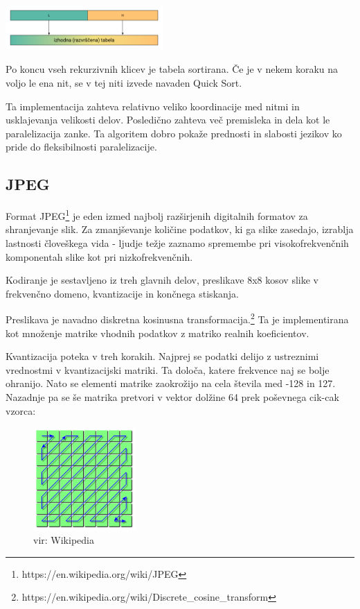\documentclass[journal,a4paper,twoside]{sty/IEEEtran}
\begin{document}
\includegraphics[width=0.45\textwidth]{aqs_diag_4}

Po koncu vseh rekurzivnih klicev je tabela sortirana.
Če je v nekem koraku na voljo le ena nit, se v tej niti izvede navaden Quick Sort.

Ta implementacija zahteva relativno veliko koordinacije med nitmi in usklajevanja velikosti delov.
Posledično zahteva več premisleka in dela kot le paralelizacija zanke.
Ta algoritem dobro pokaže prednosti in slabosti jezikov ko pride do fleksibilnosti paralelizacije.

\subsection{JPEG}

Format JPEG\footnote{https://en.wikipedia.org/wiki/JPEG} je eden izmed najbolj razširjenih digitalnih formatov za shranjevanje slik.
Za zmanjševanje količine podatkov, ki ga slike zasedajo, izrablja lastnosti človeškega vida - ljudje težje zaznamo spremembe pri visokofrekvenčnih
	komponentah slike kot pri nizkofrekvenčnih.

Kodiranje je sestavljeno iz treh glavnih delov, preslikave 8x8 kosov slike v frekvenčno domeno, kvantizacije in končnega stiskanja.

Preslikava je navadno diskretna kosinusna transformacija.\footnote{https://en.wikipedia.org/wiki/Discrete\_cosine\_transform}
Ta je implementirana kot množenje matrike vhodnih podatkov z matriko realnih koeficientov.

Kvantizacija poteka v treh korakih.
Najprej se podatki delijo z ustreznimi vrednostmi v kvantizacijski matriki.
Ta določa, katere frekvence naj se bolje ohranijo.
Nato se elementi matrike zaokrožijo na cela števila med -128 in 127.
Nazadnje pa se še matrika pretvori v vektor dolžine 64 prek poševnega cik-cak vzorca:

\begin{figure}[h]
\centering
\includegraphics[width=0.35\textwidth]{jpeg_zigzag}
\caption{vir: Wikipedia}
\end{figure}
\end{document}
